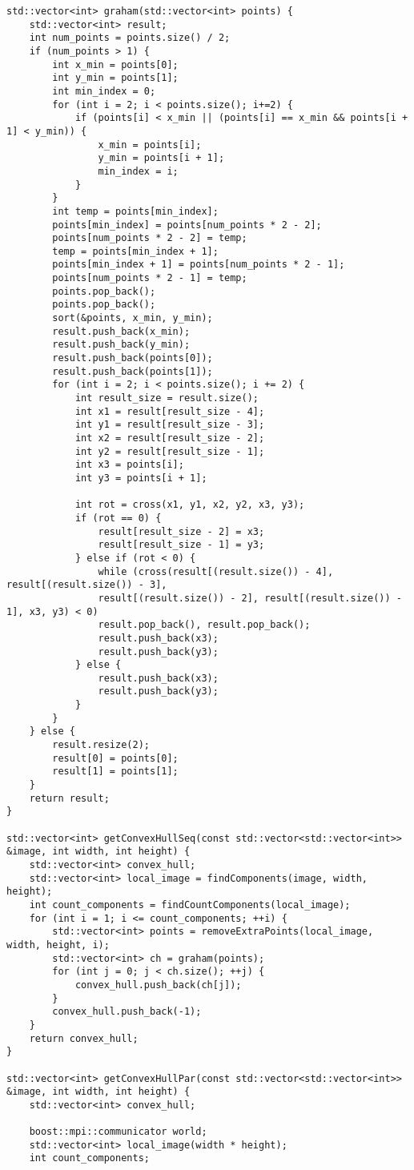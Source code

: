 \begin{verbatim}
std::vector<int> graham(std::vector<int> points) {
	std::vector<int> result;
	int num_points = points.size() / 2;
	if (num_points > 1) {
		int x_min = points[0];
		int y_min = points[1];
		int min_index = 0;
		for (int i = 2; i < points.size(); i+=2) {
			if (points[i] < x_min || (points[i] == x_min && points[i + 1] < y_min)) {
				x_min = points[i];
				y_min = points[i + 1];
				min_index = i;
			}
		}
		int temp = points[min_index];
		points[min_index] = points[num_points * 2 - 2];
		points[num_points * 2 - 2] = temp;
		temp = points[min_index + 1];
		points[min_index + 1] = points[num_points * 2 - 1];
		points[num_points * 2 - 1] = temp;
		points.pop_back();
		points.pop_back();
		sort(&points, x_min, y_min);
		result.push_back(x_min);
		result.push_back(y_min);
		result.push_back(points[0]);
		result.push_back(points[1]);
		for (int i = 2; i < points.size(); i += 2) {
			int result_size = result.size();
			int x1 = result[result_size - 4];
			int y1 = result[result_size - 3];
			int x2 = result[result_size - 2];
			int y2 = result[result_size - 1];
			int x3 = points[i];
			int y3 = points[i + 1];
			
			int rot = cross(x1, y1, x2, y2, x3, y3);
			if (rot == 0) {
				result[result_size - 2] = x3;
				result[result_size - 1] = y3;
			} else if (rot < 0) {
				while (cross(result[(result.size()) - 4], result[(result.size()) - 3],
				result[(result.size()) - 2], result[(result.size()) - 1], x3, y3) < 0)
				result.pop_back(), result.pop_back();
				result.push_back(x3);
				result.push_back(y3);
			} else {
				result.push_back(x3);
				result.push_back(y3);
			}
		}
	} else {
		result.resize(2);
		result[0] = points[0];
		result[1] = points[1];
	}
	return result;
}

std::vector<int> getConvexHullSeq(const std::vector<std::vector<int>> &image, int width, int height) {
	std::vector<int> convex_hull;
	std::vector<int> local_image = findComponents(image, width, height);
	int count_components = findCountComponents(local_image);
	for (int i = 1; i <= count_components; ++i) {
		std::vector<int> points = removeExtraPoints(local_image, width, height, i);
		std::vector<int> ch = graham(points);
		for (int j = 0; j < ch.size(); ++j) {
			convex_hull.push_back(ch[j]);
		}
		convex_hull.push_back(-1);
	}
	return convex_hull;
}

std::vector<int> getConvexHullPar(const std::vector<std::vector<int>> &image, int width, int height) {
	std::vector<int> convex_hull;
	
	boost::mpi::communicator world;
	std::vector<int> local_image(width * height);
	int count_components;
	

\end{verbatim}
